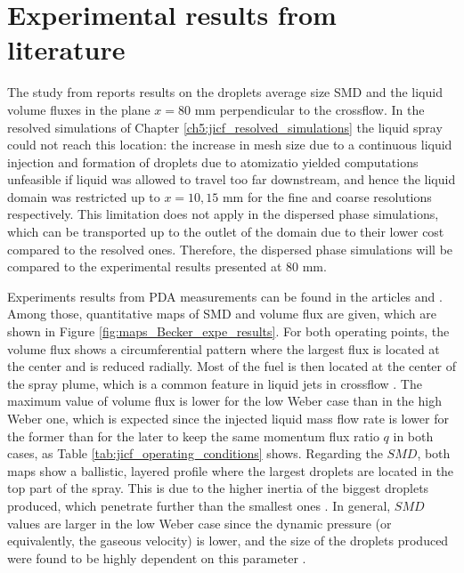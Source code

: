 \section{Experimental results from literature}

The study from  reports results on the droplets average size SMD and the liquid volume fluxes in the plane $x = 80$  mm perpendicular to the crossflow. In the resolved simulations of Chapter \ref{ch5:jicf_resolved_simulations} the liquid spray could not reach this location: the increase in mesh size due to a continuous liquid injection and formation of droplets due to atomizatio yielded computations unfeasible if liquid was allowed to travel too far downstream, and hence the liquid domain was restricted up to $x = 10, 15$ mm for the fine and coarse resolutions respectively. This limitation does not apply in the dispersed phase simulations, which can be transported up to the outlet of the domain due to their lower cost compared to the resolved ones. Therefore, the dispersed phase simulations will be compared to the experimental results presented at 80 mm.

Experiments results from PDA measurements can be found in the articles  and . Among those, quantitative maps of SMD and volume flux are given, which are shown in Figure \ref{fig:maps_Becker_expe_results}. For both operating points, the volume flux shows a circumferential pattern where the largest flux is located at the center and is reduced radially. Most of the fuel is then located at the center of the spray plume, which is a common feature in liquid jets in crossflow \citepColor[wu_spray_1998]. The maximum value of volume flux is lower for the low Weber case than in the high Weber one, which is expected since the injected liquid mass flow rate is lower for the former than for the later to keep the same momentum flux ratio $q$ in both cases, as Table \ref{tab:jicf_operating_conditions} shows. Regarding the $SMD$, both maps show a ballistic, layered profile where the largest droplets are located in the top part of the spray. This is due to the higher inertia of the biggest droplets produced, which penetrate further than the smallest ones \citepColor[wu_breakup_1997]. In general, $SMD$ values are larger in the low Weber case since the dynamic pressure (or equivalently, the gaseous velocity) is lower, and the size of the droplets produced were found to be highly dependent on this parameter .



